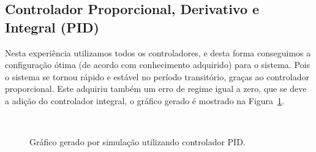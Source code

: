\documentclass[a4paper]{article}
\begin{document}
\subsection{Controlador Proporcional, Derivativo e Integral (PID)}
Nesta experiência utilizamos todos os controladores, e desta forma conseguimos a configuração ótima
(de acordo com conhecimento adquirido) para o sistema. Pois o sistema se tornou rápido e estável no
período transitório, graças ao controlador proporcional. Este adquiriu também um erro de regime igual
a zero, que se deve a adição do controlador integral, o gráfico gerado é mostrado na Figura~\ref{fig:exp4_simulacao}.

\begin{figure}[h]
   \centering
   \\ 
   \caption{Gráfico gerado por simulação utilizando controlador PID.}
   \label{fig:exp4_simulacao}
\end{figure}


 
\end{document}

